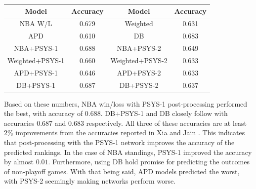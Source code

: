 \documentclass[12pt]{article}%
\begin{document}
\begin{center}
\begin{tabular}{|c c|c c|}
\hline
\textbf{Model} & \textbf{Accuracy} & \textbf{Model} & \textbf{Accuracy}\\\hline
NBA W/L&0.679&Weighted&0.631\\\hline
APD&0.610&DB&0.683\\\hline
NBA+PSYS-1&0.688&NBA+PSYS-2&0.649\\\hline
Weighted+PSYS-1&0.660&Weighted+PSYS-2&0.633\\\hline
APD+PSYS-1&0.646&APD+PSYS-2&0.633\\\hline
DB+PSYS-1&0.687&DB+PSYS-2&0.637\\\hline
\end{tabular}
\end{center}
Based on these numbers, NBA win/loss with PSYS-1 post-processing performed the best, with accuracy of $0.688$. DB+PSYS-1 and DB closely follow with accuracies $0.687$ and $0.683$ respectively. All three of these accuracies are at least $2\%$ improvements from the accuracies reported in Xia and Jain \cite{XJ}. This indicates that post-processing with the PSYS-1 network improves the accuracy of the predicted rankings. In the case of NBA standings, PSYS-1 improved the accuracy by almost $0.01$. Furthermore, using DB hold promise for predicting the outcomes of non-playoff games. With that being said, APD models predicted the worst, with PSYS-2 seemingly making networks perform worse.
\end{document}
